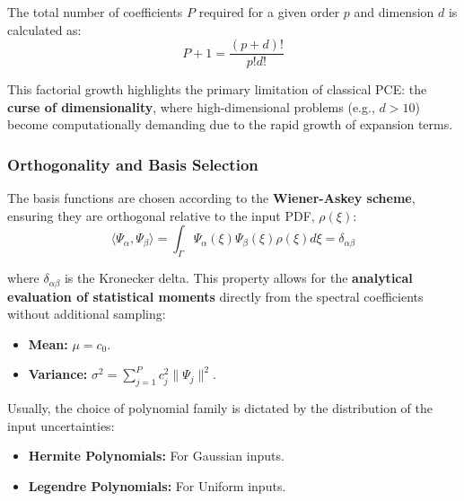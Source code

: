 \documentclass[
  letterpaper,
  DIV=11,
  numbers=noendperiod,
  oneside]{scrartcl}
\begin{document}
The total number of coefficients \(P\) required for a given order \(p\)
and dimension \(d\) is calculated as: \[P+1 = \frac{(p+d)!}{p!d!}\]

This factorial growth highlights the primary limitation of classical
PCE: the \textbf{curse of dimensionality}, where high-dimensional
problems (e.g., \(d > 10\)) become computationally demanding due to the
rapid growth of expansion terms.

\subsubsection{Orthogonality and Basis
Selection}\label{orthogonality-and-basis-selection}

The basis functions are chosen according to the \textbf{Wiener-Askey
scheme}, ensuring they are orthogonal relative to the input PDF,
\(\rho(\xi)\): \[
\langle \Psi_\alpha, \Psi_\beta \rangle = \int_{\Gamma} \Psi_\alpha(\xi) \Psi_\beta(\xi) \rho(\xi) d\xi = \delta_{\alpha\beta}
\]

where \(\delta_{\alpha\beta}\) is the Kronecker delta. This property
allows for the \textbf{analytical evaluation of statistical moments}
directly from the spectral coefficients without additional sampling:

\begin{itemize}
\item
  \textbf{Mean:} \(\mu = c_0\).
\item
  \textbf{Variance:} \(\sigma^2 = \sum_{j=1}^P c_j^2 \|\Psi_j\|^2\).
\end{itemize}

\begin{tcolorbox}[enhanced jigsaw, arc=.35mm, bottomrule=.15mm, bottomtitle=1mm, breakable, colback=white, colbacktitle=quarto-callout-tip-color!10!white, colframe=quarto-callout-tip-color-frame, coltitle=black, left=2mm, leftrule=.75mm, opacityback=0, opacitybacktitle=0.6, rightrule=.15mm, title=\textcolor{quarto-callout-tip-color}{\faLightbulb}\hspace{0.5em}{Polynomial Families and Corresponding Input Distributions}, titlerule=0mm, toprule=.15mm, toptitle=1mm]

Usually, the choice of polynomial family is dictated by the distribution
of the input uncertainties:

\begin{itemize}
\item
  \textbf{Hermite Polynomials:} For Gaussian inputs.
\item
  \textbf{Legendre Polynomials:} For Uniform inputs.
\end{itemize}

\end{tcolorbox}
\end{document}
